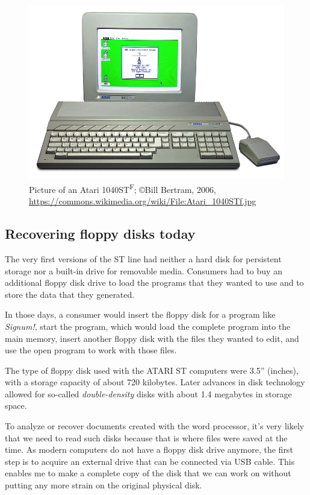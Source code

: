 \begin{figure}[h]
    \centering
    \includegraphics[width=\columnwidth]{img/800px-Atari_1040STf.jpg}
    \caption{Picture of an Atari 1040ST\textsuperscript{F}; \copyright Bill Bertram, 2006, \url{https://commons.wikimedia.org/wiki/File:Atari_1040STf.jpg}}
    \label{fig:atari_1040st}
\end{figure}

\subsection{Recovering floppy disks today}
\label{sec:floppy-disks}

The very first versions of the ST line had neither a hard disk for persistent storage nor a built-in drive for removable media. Consumers had to buy an additional floppy disk drive to load the programs that they wanted to use and to store the data that they generated.

In those days, a consumer would insert the floppy disk for a program like \textit{Signum!}, start the program, which would load the complete program into the main memory, insert another floppy disk with the files they wanted to edit, and use the open program to work with those files.

The type of floppy disk used with the ATARI ST computers were 3.5'' (inches), with a storage capacity of about 720 kilobytes. Later advances in disk technology allowed for so-called \textit{double-density} disks with about 1.4 megabytes in storage space.

To analyze or recover documents created with the \Signum{} word processor, it's very likely that we need to read such disks because that is where files were saved at the time. As modern computers do not have a floppy disk drive anymore, the first step is to acquire an external drive that can be connected via USB cable. This enables me to make a complete copy of the disk that we can work on without putting any more strain on the original physical disk.

